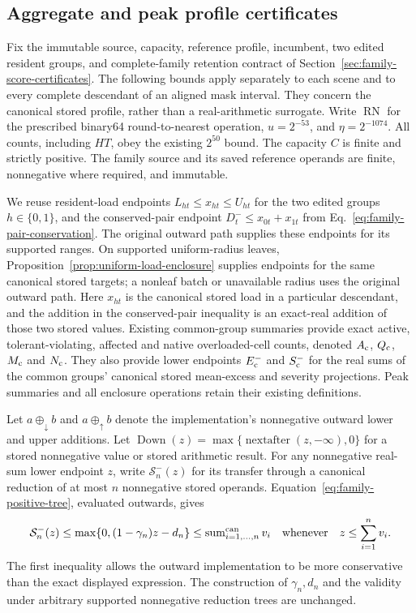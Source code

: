 \documentclass[11pt]{article}
\begin{document}
\subsection{Aggregate and peak profile certificates}
\label{sec:aggregate-peak-acquisition}

Fix the immutable source, capacity, reference profile, incumbent, two edited resident groups, and complete-family retention contract of Section~\ref{sec:family-score-certificates}. The following bounds apply separately to each scene and to every complete descendant of an aligned mask interval. They concern the canonical stored profile, rather than a real-arithmetic surrogate. Write $\operatorname{RN}$ for the prescribed binary64 round-to-nearest operation, $u=2^{-53}$, and $\eta=2^{-1074}$. All counts, including $HT$, obey the existing $2^{50}$ bound. The capacity $C$ is finite and strictly positive. The family source and its saved reference operands are finite, nonnegative where required, and immutable.

We reuse resident-load endpoints $L_{ht}\le x_{ht}\le U_{ht}$ for the two edited groups $h\in\{0,1\}$, and the conserved-pair endpoint $D_t^-\le x_{0t}+x_{1t}$ from Eq.~\eqref{eq:family-pair-conservation}. The original outward path supplies these endpoints for its supported ranges. On supported uniform-radius leaves, Proposition~\ref{prop:uniform-load-enclosure} supplies endpoints for the same canonical stored targets; a nonleaf batch or unavailable radius uses the original outward path. Here $x_{ht}$ is the canonical stored load in a particular descendant, and the addition in the conserved-pair inequality is an exact-real addition of those two stored values. Existing common-group summaries provide exact active, tolerant-violating, affected and native overloaded-cell counts, denoted $A_{\rm c}$, $Q_{\rm c}$, $M_{\rm c}$ and $N_{\rm c}$. They also provide lower endpoints $E_{\rm c}^-$ and $S_{\rm c}^-$ for the real sums of the common groups' canonical stored mean-excess and severity projections. Peak summaries and all enclosure operations retain their existing definitions.

Let $a\oplus_\downarrow b$ and $a\oplus_\uparrow b$ denote the implementation's nonnegative outward lower and upper additions. Let $\operatorname{Down}(z)=\max\{\operatorname{nextafter}(z,-\infty),0\}$ for a stored nonnegative value or stored arithmetic result. For any nonnegative real-sum lower endpoint $z$, write $\mathcal S_n^-(z)$ for its transfer through a canonical reduction of at most $n$ nonnegative stored operands. Equation~\eqref{eq:family-positive-tree}, evaluated outwards, gives
\begin{equation}
\mathcal S_n^-(z)\le \max\{0,(1-\gamma_n)z-d_n\}\le \operatorname{sum}^{\rm can}_{i=1,\ldots,n} v_i
\quad\text{whenever}\quad z\le\sum_{i=1}^n v_i.
\label{eq:aggregate-stored-transfer}
\end{equation}
The first inequality allows the outward implementation to be more conservative than the exact displayed expression. The construction of $\gamma_n,d_n$ and the validity under arbitrary supported nonnegative reduction trees are unchanged.
\end{document}

